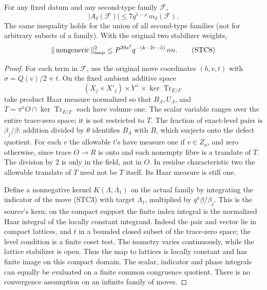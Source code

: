 \begin{theorem}
\label{thm:flag-second-type-cancellation}
For any fixed datum and any second-type family \(\mathcal F\),
\[
 |A_\delta(\mathcal F)|
 \le 7 q^{1-\rho}\,m_\delta(\mathcal F).              \tag{STC7}
\]
The same inequality holds for the union of all second-type
families (not for arbitrary subsets of a family).
With the original two stabilizer weights,
\[
 \|\,\mathrm{nongeneric}\,\|_{\rm amp}^2
 \le P^{39s^2}q^{-(k-2r-5)}\,nn.                     \tag{STC8}
\]
\end{theorem}
\begin{proof}
For each term in \(\mathcal F\), use the original
move coordinates \((b,v,t)\) with
\(\sigma=Q(v)/2+t\). On the fixed ambient additive space
\[
 (X_j\times X'_j)\times Y^\perp
              \times\ker\operatorname{Tr}_{E/F}
\]
take product Haar measure normalized so that
\(B_\Lambda,U_\Lambda\), and
\(T=\pi^a O\cap\ker\operatorname{Tr}_{E/F}\)
each have volume one. The scalar variable ranges over
the entire trace-zero space; it is not restricted to \(T\).
The fraction of exact-level pairs is
\(\beta_j/\beta\): addition divided by \(\theta\)
identifies \(B_\Lambda\) with \(B\), which surjects
onto the defect quotient. For each \(v\) the allowable
\(t\)'s have measure one if \(v\in Z_a\), and zero
otherwise, since trace \(O\to R\) is onto and each
nonempty fibre is a translate of \(T\).
The division by 2 is only in the field, not in \(O\).
In residue characteristic two the allowable translate of
\(T\) need not be \(T\) itself. Its Haar measure is still one.

Define a nonnegative kernel \(K(\Lambda,\Lambda_1)\)
on the actual family by integrating the indicator of
the move (STC3) with target \(\Lambda_1\), multiplied
by \(q^a\beta/\beta_j\).
This is the source's \(\mathrm{kern}\): on the compact
support the finite index integral is the normalized
Haar integral of the locally constant integrand.
Indeed the pair and vector lie in compact lattices,
and \(t\) in a bounded closed subset of the trace-zero
space; the level condition is a finite coset test.
The isometry varies continuously, while the lattice
stabilizer is open. Thus the map to lattices is
locally constant and has finite image on this
compact domain. The scalar, indicator and phase
integrals can equally be evaluated on a finite
common congruence quotient. There is no convergence
assumption on an infinite family of moves.


\end{proof}
